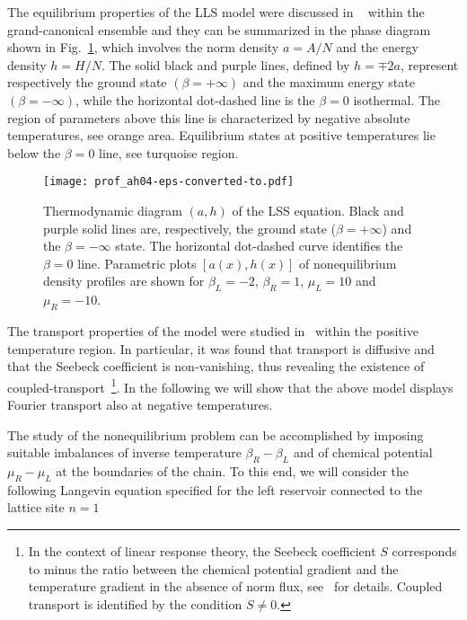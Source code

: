 \documentclass[iop, twocolumns, amssymb,notitlepage]{revtex4-1}
\newcommand{\indice}{n}
\begin{document}
The equilibrium properties of the LLS model were discussed in
~\cite{buonsante16,iubini19} within the grand-canonical ensemble and they can be summarized in the phase diagram shown in Fig.~\ref{fig:DLS0}, which involves 
the norm density $a=A/N$ and the energy density $h=H/N$. 
The solid black and purple lines, defined by $h=\mp 2a$, represent
 respectively the ground  state $(\beta=+\infty)$ and the maximum energy state $(\beta=-\infty)$, while the horizontal dot-dashed line is the $\beta=0$ isothermal. 
 The region of parameters above this line is characterized by  negative absolute temperatures, see orange  area.
Equilibrium states at positive temperatures lie below the $\beta=0$ line, see turquoise region.
%
\begin{figure}
 \centering
\texttt{[image: prof\_ah04-eps-converted-to.pdf]}
\caption{\label{fig:DLS0} 
Thermodynamic diagram $(a,h)$ of the LSS equation. Black and purple solid lines are, respectively, the ground state ($\beta=+\infty$)
and the $\beta=-\infty$ state. The horizontal dot-dashed curve identifies the $\beta=0$ line. Parametric plots $[a(x),h(x)]$ of
nonequilibrium  density profiles are shown for $\beta_L=-2$, $\beta_R=1$, $\mu_L=10$ and $\mu_R=-10$. }
 \end{figure}
 
The transport properties of the model were studied in~\cite{iubini19} within the positive temperature region. In particular,
it was found that transport is diffusive and that the Seebeck coefficient is  non-vanishing, thus revealing the existence of coupled-transport~\footnote{In the context of linear response theory, the Seebeck coefficient $S$ corresponds to minus the ratio between the chemical potential gradient and the temperature gradient in the absence of norm flux, see~\cite{iubini12} for details. Coupled transport is identified by the condition $S\neq 0$.}.
  In the following we will show that the above model displays Fourier transport
also at negative temperatures.

The study of the nonequilibrium problem can be accomplished by
imposing suitable imbalances  of inverse temperature $\beta_R-\beta_L$ and of chemical 
potential $\mu_R-\mu_L$ at the boundaries of the chain.  
To this end, we will consider  the following Langevin equation specified for the 
left reservoir 	 connected to the lattice site $\indice=1$
\end{document}
